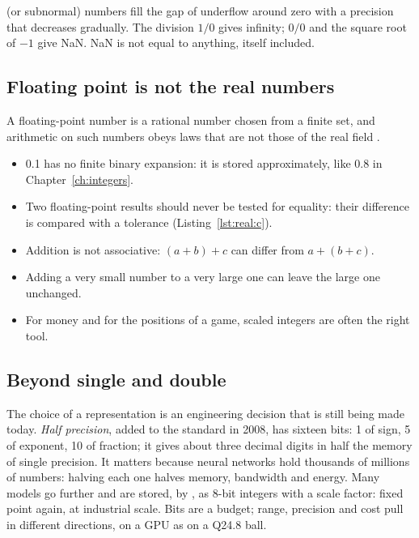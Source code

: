  (or subnormal) numbers fill the gap of underflow around
zero with a precision that decreases gradually. The division $1/0$ gives
infinity; $0/0$ and the square root of $-1$ give NaN. NaN is not equal to
anything, itself included.

\subsection{Floating point is not the real numbers}

A floating-point number is a rational number chosen from a finite set, and
arithmetic on such numbers obeys laws that are not those of the real field
\citep{goldberg1991}.

\begin{itemize}
\item 0.1 has no finite binary expansion: it is stored approximately, like 0.8
  in Chapter~\ref{ch:integers}.
\item Two floating-point results should never be tested for equality: their
  difference is compared with a tolerance (Listing~\ref{lst:real:c}).
\item Addition is not associative: $(a+b)+c$ can differ from $a+(b+c)$.
\item Adding a very small number to a very large one can leave the large one
  unchanged.
\item For money and for the positions of a game, scaled integers are often the
  right tool.
\end{itemize}


\subsection{Beyond single and double}

The choice of a representation is an engineering decision that is still being
made today. \emph{Half precision}, added to the standard in 2008, has sixteen
bits: 1 of sign, 5 of exponent, 10 of fraction; it gives about three decimal
digits in half the memory of single precision. It matters because neural
networks hold thousands of millions of numbers: halving each one halves
memory, bandwidth and energy. Many models go further and are stored, by
, as 8-bit integers with a scale factor: fixed point again,
at industrial scale. Bits are a budget; range, precision and cost pull in
different directions, on a GPU as on a Q24.8 ball.

